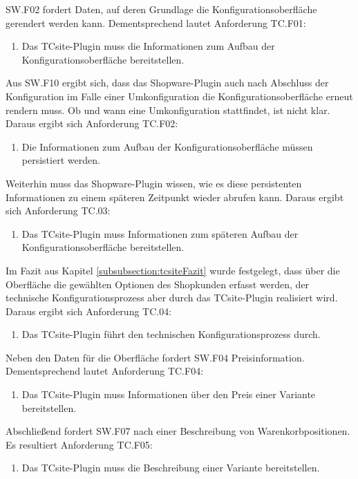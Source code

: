 \documentclass[12pt,a4paper,bibliography=totocnumbered,listof=totoc]{scrartcl}
\begin{document}
SW.F02 fordert Daten, auf deren Grundlage die Konfigurationsoberfläche gerendert werden kann. Dementsprechend lautet Anforderung TC.F01:
\begin{enumerate}[TC.F01:]\bfseries
\item Das TCsite-Plugin muss die Informationen zum Aufbau der Konfigurationsoberfläche bereitstellen.
\end{enumerate}
Aus SW.F10 ergibt sich, dass das Shopware-Plugin auch nach Abschluss der Konfiguration im Falle einer Umkonfiguration die Konfigurationsoberfläche erneut rendern muss. Ob und wann eine Umkonfiguration stattfindet, ist nicht klar. Daraus ergibt sich Anforderung TC.F02:
\begin{enumerate}[TC.F02:]\bfseries
\item Die Informationen zum Aufbau der Konfigurationsoberfläche müssen persistiert werden.
\end{enumerate}
Weiterhin muss das Shopware-Plugin wissen, wie es diese persistenten Informationen zu einem späteren Zeitpunkt wieder abrufen kann. Daraus ergibt sich Anforderung TC.03:
\begin{enumerate}[TC.F03:]\bfseries
\item Das TCsite-Plugin muss Informationen zum späteren Aufbau der Konfigurationsoberfläche bereitstellen.
\end{enumerate}
Im Fazit aus Kapitel \ref{subsubsection:tcsiteFazit} wurde festgelegt, dass über die Oberfläche die gewählten Optionen des Shopkunden erfasst werden, der technische Konfigurationsprozess aber durch das TCsite-Plugin realisiert wird. Daraus ergibt sich Anforderung TC.04:
\begin{enumerate}[TC.F04:]\bfseries
\item Das TCsite-Plugin führt den technischen Konfigurationsprozess durch.
\end{enumerate}
Neben den Daten für die Oberfläche fordert SW.F04 Preisinformation. Dementsprechend lautet Anforderung TC.F04:
\begin{enumerate}[TC.F04:]\bfseries
\item Das TCsite-Plugin muss Informationen über den Preis einer Variante bereitstellen.
\end{enumerate}
Abschließend fordert SW.F07 nach einer Beschreibung von Warenkorbpositionen. Es resultiert Anforderung TC.F05:
\begin{enumerate}[TC.F05:]\bfseries
\item Das TCsite-Plugin muss die Beschreibung einer Variante bereitstellen.
\end{enumerate}
\end{document}
